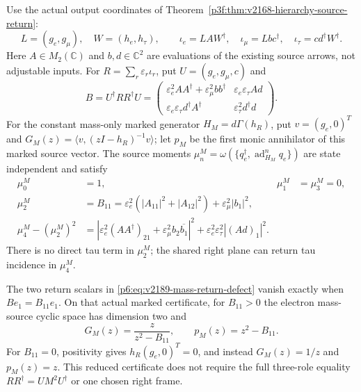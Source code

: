 \documentclass[12pt,a4paper]{article}
\begin{document}
\begin{theorem}
\label{p6:thm:v2189-hierarchy-mass-moments}
Use the actual output coordinates of
Theorem~\ref{p3f:thm:v2168-hierarchy-source-return}:
\[
 L=(g_e,g_\mu),\quad W=(h_e,h_\tau),\qquad
 \iota_e=LAW^\dagger,\quad
 \iota_\mu=Lbc^\dagger,\quad
 \iota_\tau=cd^\dagger W^\dagger.
\]
Here $A\in M_2(\mathbb C)$ and $b,d\in\mathbb C^2$ are evaluations of the
existing source arrows, not adjustable inputs. For
$R=\sum_r\varepsilon_r\iota_r$, put $U=(g_e,g_\mu,c)$ and
\[
 B=U^\dagger RR^\dagger U=
 \begin{pmatrix}
 \varepsilon_e^2AA^\dagger+\varepsilon_\mu^2bb^\dagger
       &\varepsilon_e\varepsilon_\tau Ad\\
 \varepsilon_e\varepsilon_\tau d^\dagger A^\dagger
       &\varepsilon_\tau^2d^\dagger d
 \end{pmatrix}.
\]
For the constant mass-only marked generator $H_M=d\Gamma(h_R)$, put
$v=(g_e,0)^T$ and $G_M(z)=\langle v,(zI-h_R)^{-1}v\rangle$;
let $p_M$ be the first monic annihilator of this marked source vector.
The source moments
$\mu_n^M=\omega(\{q_e^\dagger,\operatorname{ad}_{H_M}^nq_e\})$
are state independent and satisfy
\begin{align}
 \mu_0^M&=1,&\mu_1^M&=\mu_3^M=0,\\
 \mu_2^M&=B_{11}
  =\varepsilon_e^2(|A_{11}|^2+|A_{12}|^2)
                    +\varepsilon_\mu^2|b_1|^2,
 \label{p6:eq:v2189-mass-second-moment}\\
 \mu_4^M-(\mu_2^M)^2
 &=\left|\varepsilon_e^2(AA^\dagger)_{21}
                 +\varepsilon_\mu^2b_2\overline{b_1}\right|^2
       +\varepsilon_e^2\varepsilon_\tau^2|(Ad)_1|^2.
 \label{p6:eq:v2189-mass-return-defect}
\end{align}
There is no direct tau term in $\mu_2^M$; the shared right plane can return
tau incidence in $\mu_4^M$.

The two return scalars in \eqref{p6:eq:v2189-mass-return-defect} vanish
exactly when $Be_1=B_{11}e_1$. On that actual marked certificate, for
$B_{11}>0$ the electron mass-source cyclic space has dimension two and
\[
 G_M(z)=\frac{z}{z^2-B_{11}},\qquad p_M(z)=z^2-B_{11}.
\]
For $B_{11}=0$, positivity gives $h_R(g_e,0)^T=0$, and instead
$G_M(z)=1/z$ and $p_M(z)=z$. This reduced certificate does not require
the full three-role equality $RR^\dagger=UM^2U^\dagger$ or one chosen
right frame.
\end{theorem}
\end{document}
